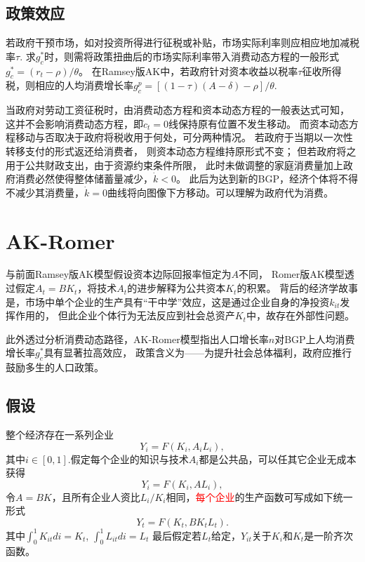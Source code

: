 \documentclass[cn,normal,11pt,black]{elegantnote}
\begin{document}
\subsection{政策效应} 
\label{goverpolicy}

    若政府干预市场，如对投资所得进行征税或补贴，市场实际利率则应相应地加减税率$\tau$. 
    求$g^*_c$时，则需将政策扭曲后的市场实际利率带入消费动态方程的一般形式$g^*_c = (r_t - \rho)/\theta$。
    在Ramsey版AK中，若政府针对资本收益以税率$\tau$征收所得税，则相应的人均消费增长率$g_c^p = [(1-\tau)(A-\delta) - \rho] / \theta$.
    
    当政府对劳动工资征税时，由消费动态方程和资本动态方程的一般表达式可知，
    这并不会影响消费动态方程，即$\dot{c}_t=0$线保持原有位置不发生移动。
    而资本动态方程移动与否取决于政府将税收用于何处，可分两种情况。
    若政府于当期以一次性转移支付的形式返还给消费者，
    则资本动态方程维持原形式不变；
    但若政府将之用于公共财政支出，由于资源约束条件所限，
    此时未做调整的家庭消费量加上政府消费必然使得整体储蓄量减少，$\dot{k}<0$。
    此后为达到新的BGP，经济个体将不得不减少其消费量，$\dot{k}=0$曲线将向图像下方移动。可以理解为政府代为消费。

\section{AK-Romer}

与前面Ramsey版AK模型假设资本边际回报率恒定为$A$不同，
Romer版AK模型透过假定$A_t = B K_t$，将技术$A_t$的进步解释为公共资本$K_t$的积累。
背后的经济学故事是，市场中单个企业的生产具有“干中学”效应，这是通过企业自身的净投资$k_{it}$发挥作用的，
但此企业个体行为无法反应到社会总资产$K_t$中，故存在外部性问题。

此外透过分析消费动态路径，AK-Romer模型指出人口增长率$n$对BGP上人均消费增长率$g^*_c$具有显著拉高效应，
政策含义为——为提升社会总体福利，政府应推行鼓励多生的人口政策。


\subsection{假设}

\begin{definition}[生产函数]
    整个经济存在一系列企业
    \begin{equation}
        Y_{i} = F(K_{i}, A_i L_i),
    \end{equation}
    其中$i \in [0,1]$.假定每个企业的知识与技术$A_i$都是公共品，可以任其它企业无成本获得
    \begin{equation}
        Y_{i} = F(K_{i}, A L_i),
    \end{equation}  
    令$A=BK$，且所有企业人资比$L_i/K_i$相同，\textcolor{red}{每个企业}的生产函数可写成如下统一形式
    \begin{equation}
        Y_{t} = F(K_{t}, BK_{t}L_t).
    \end{equation} 
    其中$\int_{0}^{1} K_{it} d i = K_t$, $\int_{0}^{1} L_{it} d i = L_t$
    最后假定若$L_t$给定，$Y_{it}$关于$K_i$和$K_t$是一阶齐次函数。
\end{definition}
\end{document}
